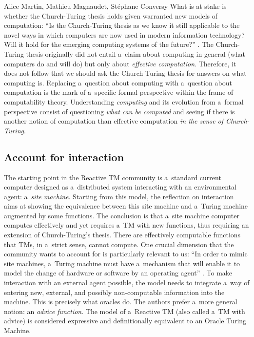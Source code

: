 \begin{artengenv2auth}{Alice Martin, Mathieu Magnaudet, Stéphane Conversy}
What is at stake is whether the Church-Turing thesis holds given warranted new models of computation: ``Is the Church-Turing thesis as we know it still applicable to the novel ways in which computers are now used in modern information technology? Will it hold for the emerging computing systems of the future?'' \parencite{VanLeeuwen2001}. 
The Church-Turing thesis originally did not entail a~claim about computing in general (what computers do and will do) but only about \textit{effective computation}. Therefore, it does not follow that we should ask the Church-Turing thesis for answers on what computing is. Replacing a~question about computing with a~question about computation is the mark of a~specific formal perspective within the frame of computability theory. Understanding \textit{computing} and its evolution from a~formal perspective consist of questioning \textit{what can be computed} and seeing if there is another notion of computation than effective computation \textit{in the sense of Church-Turing}. 

\subsection{Account for interaction}

The starting point in the Reactive TM community is a~standard current computer designed as a~distributed system interacting with an environmental agent: a~\textit{site machine}. Starting from this model, the reflection on interaction aims at showing the equivalence between this site machine and a~Turing machine augmented by some functions. The conclusion is that a~site machine computer computes effectively and yet requires a~TM with new functions, thus requiring an extension of Church-Turing's thesis. There are effectively computable functions that TMs, in a~strict sense, cannot compute. One crucial dimension that the community wants to account for is particularly relevant to us: ``In order to mimic site machines, a~Turing machine must have a~mechanism that will enable it to model the change of hardware or software by an operating agent'' \parencite{VanLeeuwen2001}. To make interaction with an external agent possible, the model needs to integrate a~way of entering new, external, and possibly non-computable information into the machine. This is precisely what oracles do. The authors prefer a~more general notion: an \textit{advice function}. The model of a~Reactive TM (also called a~TM with advice) is considered expressive and definitionally equivalent to an Oracle Turing Machine.	


\end{artengenv2auth}
